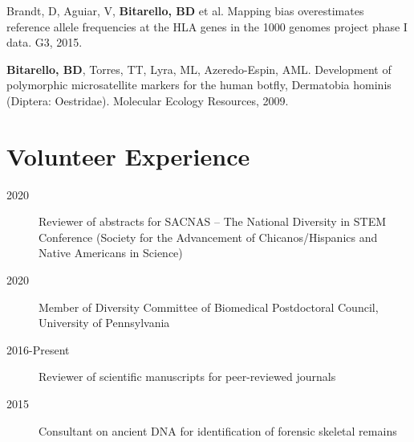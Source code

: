 \documentclass{article}
\begin{document}
Brandt, D, Aguiar, V, \textbf{Bitarello, BD} et al. Mapping bias overestimates reference allele
frequencies at the HLA genes in the 1000 genomes project phase I data. G3, 2015.

\textbf{Bitarello, BD}, Torres, TT,  Lyra, ML, Azeredo-Espin, AML. Development of polymorphic microsatellite markers for the human botfly, Dermatobia hominis (Diptera: Oestridae). Molecular Ecology Resources, 2009.

\section{Volunteer Experience}

\begin{description} 
\item [2020] Reviewer of abstracts for SACNAS – The National Diversity in STEM Conference (Society for the Advancement of Chicanos/Hispanics and Native Americans in Science) 
\item [2020] Member of Diversity Committee of Biomedical Postdoctoral Council, University of Pennsylvania
\item [2016-Present] Reviewer of scientific manuscripts for peer-reviewed journals
\item [2015] Consultant on ancient DNA for identification of forensic skeletal remains
\end{description}
\end{document}

